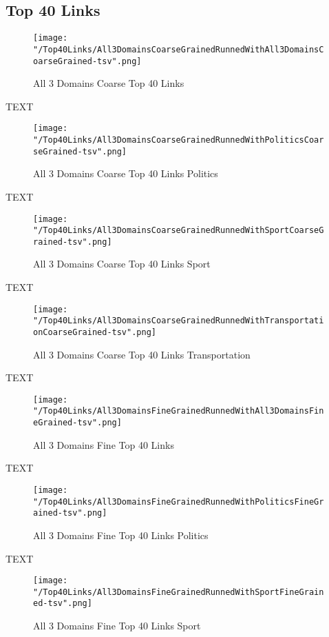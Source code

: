\documentclass[thesis=M,english]{FITthesis}[2018/05/30]
\begin{document}
\subsection{Top 40 Links}

	\begin{figure}\centering
		\texttt{[image: "/Top40Links/All3DomainsCoarseGrainedRunnedWithAll3DomainsCoarseGrained-tsv".png]}
		\caption{All 3 Domains Coarse Top 40 Links}\label{}
	\end{figure}

	TEXT

	\begin{figure}\centering
		\texttt{[image: "/Top40Links/All3DomainsCoarseGrainedRunnedWithPoliticsCoarseGrained-tsv".png]}
		\caption{All 3 Domains Coarse Top 40 Links Politics}\label{}
	\end{figure}	

	TEXT	

	\begin{figure}\centering
		\texttt{[image: "/Top40Links/All3DomainsCoarseGrainedRunnedWithSportCoarseGrained-tsv".png]}
		\caption{All 3 Domains Coarse Top 40 Links Sport}\label{}
	\end{figure}
	
		TEXT	

	\begin{figure}\centering
		\texttt{[image: "/Top40Links/All3DomainsCoarseGrainedRunnedWithTransportationCoarseGrained-tsv".png]}
		\caption{All 3 Domains Coarse Top 40 Links Transportation}\label{}	
	\end{figure}
		
		TEXT	

	\begin{figure}\centering
		\texttt{[image: "/Top40Links/All3DomainsFineGrainedRunnedWithAll3DomainsFineGrained-tsv".png]}
		\caption{All 3 Domains Fine Top 40 Links }\label{}	
	\end{figure}
	
	TEXT

	\begin{figure}\centering
		\texttt{[image: "/Top40Links/All3DomainsFineGrainedRunnedWithPoliticsFineGrained-tsv".png]}
		\caption{All 3 Domains Fine Top 40 Links Politics}\label{}
	\end{figure}	

	TEXT	

	\begin{figure}\centering
		\texttt{[image: "/Top40Links/All3DomainsFineGrainedRunnedWithSportFineGrained-tsv".png]}
		\caption{All 3 Domains Fine Top 40 Links Sport}\label{}
	\end{figure}
	
\end{document}
